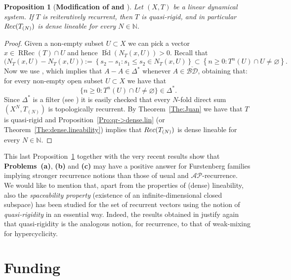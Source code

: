 \documentclass[openright,11pt]{article}
\theoremstyle{plain}
\newtheorem{proposition}[theorem]{Proposition}
\theoremstyle{definition}
\newcommand{\NN}{\mathbb{N}}
\newcommand{\AP}{\mathcal{AP}}
\newcommand{\Del}{\Delta}
\newcommand{\RRec}{\operatorname{RRec}}
\newcommand{\Rec}{\textup{Rec}}
\newcommand{\Bdsup}{\overline{\operatorname{Bd}}}
\newcommand{\BDsup}{\overline{\mathcal{BD}}}
\begin{document}
\begin{proposition}[\textbf{Modification of \cite[Proposition 4]{BMPP2016} and \cite[Proposition 5.6]{BMPP2019}}]\label{Pro:RRec->q-r}
	Let $(X,T)$ be a linear dynamical system. If $T$ is reiteratively recurrent, then $T$ is quasi-rigid, and in particular $\Rec(T_{(N)})$ is dense lineable for every $N \in \NN$.
\end{proposition}
\begin{proof}
	Given a non-empty subset $U \subset X$ we can pick a vector $x \in \RRec(T)\cap U$ and hence $\Bdsup(N_T(x,U))>0$. Recall that
	\[
	\big(N_T(x,U)-N_T(x,U)\big) := \left\{ s_2-s_1 : s_1\leq s_2 \in N_T(x,U) \right\} \subset \left\{ n\geq 0 : T^{n}(U)\cap U\neq\varnothing \right\}.
	\]%
	Now we use \cite[Theorem 3.18]{Furstenberg1981_book}, which implies that $A-A \in \Delta^*$ whenever $A \in \BDsup$, obtaining that: for every non-empty open subset $U \subset X$ we have that
	\[
	\{ n\geq0 : T^{n}(U)\cap U\neq\varnothing \} \in \Delta^*.
	\]
	Since $\Del^*$ is a filter (see \cite{BerDown2008,HS1998}) it is easily checked that every $N$-fold direct sum $(X^N,T_{(N)})$ is topologically recurrent. By Theorem~\ref{The:Juan} we have that $T$ is quasi-rigid and Proposition~\ref{Pro:qr->dense.lin} (or Theorem~\ref{The:dense.lineability}) implies that $\Rec(T_{(N)})$ is dense lineable for every $N \in \NN$.
\end{proof}

This last Proposition~\ref{Pro:RRec->q-r} together with the very recent results \cite[Theorems~5.1 and 5.8]{GriLo2023} show that \textbf{Problems~(a)}, \textbf{(b)} and \textbf{(c)} may have a positive answer for Furstenberg families implying stronger recurrence notions than those of usual and $\AP$-recurrence.\\[-5pt]

We would like to mention that, apart from the properties of (dense) lineability, also the {\em spaceability property} (existence of an infinite-dimensional closed subspace) has been studied for the set of recurrent vectors using the notion of {\em quasi-rigidity} in an essential way. Indeed, the results obtained in \cite{Lopez2024_IMRN} justify again that quasi-rigidity is the analogous notion, for recurrence, to that of weak-mixing for hypercyclicity.



\section*{Funding}
\end{document}
